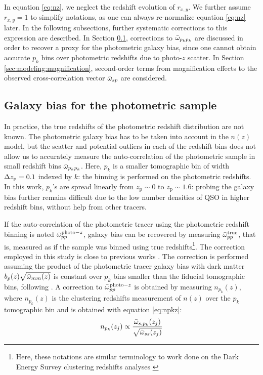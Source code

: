 \noindent In equation \ref{eq:nz}, we neglect the redshift evolution of $r_{x,y}$. We further assume $r_{x,y}=1$ to simplify notations, as one can always re-normalize equation \ref{eq:nz} later. In the following subsections, further systematic corrections to this expression are described. In Section \ref{sec:modeling:photoz_gal_bias}, corrections to $\bar{\omega}_{p_kp_k}$ are discussed in order to recover a proxy for the photometric galaxy bias, since one cannot obtain accurate $p_k$ bins over photometric redshifts due to photo-$z$ scatter. In Section \ref{sec:modeling:magnification}, second-order terms from magnification effects to the observed cross-correlation vector $\bar{\omega}_{sp}$ are considered.

\subsection{Galaxy bias for the photometric sample}\label{sec:modeling:photoz_gal_bias}


In practice, the true redshifts of the photometric redshift distribution are not known. The photometric galaxy bias has to be taken into account in the $n(z)$ model, but the scatter and potential outliers in each of the redshift bins does not allow us to accurately measure the auto-correlation of the photometric sample in small redshift bins $\bar{\omega}_{p_kp_k}$. Here, $p_k$ is a smaller tomographic bin of width $\Delta z_{\mathrm{p}}=0.1$ indexed by $k$: the binning is performed on the photometric redshifts. In this work, $p_k$'s are spread linearly from $z_{\mathrm{p}}\sim0$ to $z_{\mathrm{p}}\sim1.6$: probing the galaxy bias further remains difficult due to the low number densities of QSO in higher redshift bins, without help from other tracers.

If the auto-correlation of the photometric tracer using the photometric redshift binning is noted $\bar{\omega}_{pp}^{\mathrm{photo}-z}$, galaxy bias can be recovered by measuring $\bar{\omega}_{pp}^{\mathrm{true}}$, that is, measured as if the sample was binned using true redshifts\footnote{Here, these notations are similar terminology to work done on the Dark Energy Survey clustering redshifts analyses \cite{Cawthon2022DESY3Boss}}. The correction employed in this study is close to previous works \cite{Cawthon2022DESY3Boss, EuclidClusterRedshifts2025,KidsCrossCorrvdB2020}. The correction is performed assuming the product of the photometric tracer galaxy bias with dark matter $b_p(z)\sqrt{\bar{\omega}_{mm}(z)}$ is constant over $p_k$ bins smaller than the fiducial tomographic bins, following \cite{Cawthon2022DESY3Boss}. A correction to $\bar{\omega}_{pp}^{\mathrm{photo}-z}$ is obtained by measuring $n_{p_k}(z)$, where $n_{p_k}(z)$ is the clustering redshifts measurement of $n(z)$ over the $p_k$ tomographic bin and is obtained with equation \ref{eq:npkz}:
\begin{equation}\label{eq:npkz}
    n_{p_k}(z_j)\propto\frac{\bar{\omega}_{s,p_k}(z_j)}{\sqrt{\bar{\omega}_{ss}(z_j)}}
\end{equation} 


